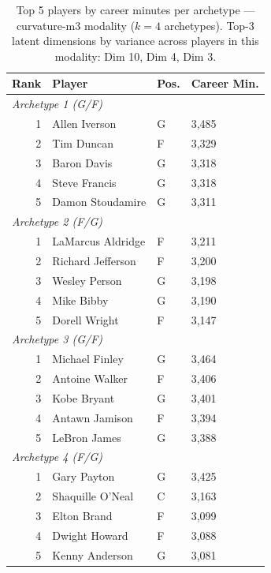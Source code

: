 \begin{table}[htbp]
  \centering\small
  \begin{tabular}{rlll}
    \toprule
    Rank & Player & Pos. & Career Min. \\
    \midrule
    \multicolumn{4}{l}{\textit{Archetype 1 (G/F)}} \\
    \midrule
    1 & Allen Iverson & G & 3,485 \\
    2 & Tim Duncan & F & 3,329 \\
    3 & Baron Davis & G & 3,318 \\
    4 & Steve Francis & G & 3,318 \\
    5 & Damon Stoudamire & G & 3,311 \\
    \midrule[0.4pt]
    \multicolumn{4}{l}{\textit{Archetype 2 (F/G)}} \\
    \midrule
    1 & LaMarcus Aldridge & F & 3,211 \\
    2 & Richard Jefferson & F & 3,200 \\
    3 & Wesley Person & G & 3,198 \\
    4 & Mike Bibby & G & 3,190 \\
    5 & Dorell Wright & F & 3,147 \\
    \midrule[0.4pt]
    \multicolumn{4}{l}{\textit{Archetype 3 (G/F)}} \\
    \midrule
    1 & Michael Finley & G & 3,464 \\
    2 & Antoine Walker & F & 3,406 \\
    3 & Kobe Bryant & G & 3,401 \\
    4 & Antawn Jamison & F & 3,394 \\
    5 & LeBron James & G & 3,388 \\
    \midrule[0.4pt]
    \multicolumn{4}{l}{\textit{Archetype 4 (F/G)}} \\
    \midrule
    1 & Gary Payton & G & 3,425 \\
    2 & Shaquille O'Neal & C & 3,163 \\
    3 & Elton Brand & F & 3,099 \\
    4 & Dwight Howard & F & 3,088 \\
    5 & Kenny Anderson & G & 3,081 \\
    \bottomrule
  \end{tabular}
  \caption{Top 5 players by career minutes per archetype --- curvature-m3 modality ($k=4$ archetypes). Top-3 latent dimensions by variance across players in this modality: Dim 10, Dim 4, Dim 3.}
  \label{tab:arch_reps_curvature_m3}
\end{table}

